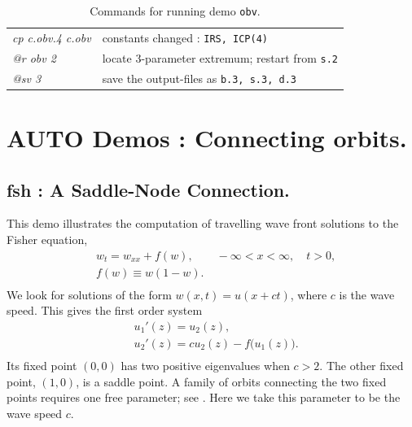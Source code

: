 \documentclass[12pt]{report}
\begin{document}
\begin{table}[htbp]
\begin{center}
\begin{tabular}{| l | l |}
\hline
  {\it cp c.obv.4 c.obv} & constants changed : {\tt IRS, ICP(4)} \\ 
  {\it @r obv  2} & locate 3-parameter extremum; restart from {\tt s.2} \\ 
  {\it @sv 3} & save the output-files as {\tt b.3, s.3, d.3} \\ 
\hline
\end{tabular}
\caption{Commands for running demo {\tt obv}.}
\label{tbl:demo_obv}
\end{center}
\end{table}

\chapter{ {\cal AUTO} Demos : Connecting orbits.} \label{ch:Demos_Heteroclinics}

\newpage
\section{ fsh : A Saddle-Node Connection.} \label{sec:Demos_fsh}
This demo illustrates the computation of travelling wave front solutions
to the Fisher equation,
\begin{equation} \begin{array}{cl}
  & w_t = w_{xx} + f(w),
  \qquad -\infty < x < \infty,
  \quad  t > 0,  \\
  & f(w) \equiv w(1-w) .  \\
\end{array} \end{equation}
We look for solutions of the form $w(x,t)=u(x+ct)$, where
$c$ is the wave speed.
This gives the first order system
\begin{equation} \begin{array}{cl}
  &  u_1'(z)  = u_2(z),  \\
  &  u_2'(z)  = c u_2(z) - f\bigl(u_1(z)\bigr).  \\
\end{array} \end{equation}
Its fixed point $(0,0)$ has two positive eigenvalues when $c>2$.
The other fixed point, $(1,0)$, is a saddle point.
A family of orbits connecting the two fixed points
requires one free parameter; see 
 \citeyear{FrDo:91}.
Here we take this parameter to be the wave speed $c$.
\end{document}
